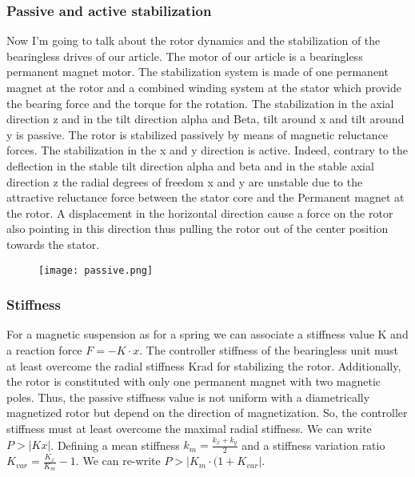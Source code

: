 \subsubsection{Passive and active stabilization}
Now I’m going to talk about the rotor dynamics and the stabilization of the bearingless drives of our article. The motor of our article is a bearingless permanent magnet motor. The stabilization system is made of one permanent magnet at the rotor and a combined winding system at the stator which provide the bearing force and the torque for the rotation.
The stabilization in the axial direction z and in the tilt direction alpha and Beta, tilt around x and tilt around y is passive. The rotor is stabilized passively by means of magnetic reluctance forces. The stabilization in the x and y direction is active.
Indeed, contrary to the deflection in the stable tilt direction alpha and beta and in the stable axial direction z the radial degrees of freedom x and y are unstable due to the attractive reluctance force between the stator core and the Permanent magnet at the rotor.
A displacement in the horizontal direction cause a force on the rotor also pointing in this direction thus pulling the rotor out of the center position towards the stator. 
\begin{figure}[H]
    \centering
    \texttt{[image: passive.png]}
\end{figure}


\subsubsection{Stiffness}
For a magnetic suspension as for a spring we can associate a stiffness value K and a reaction force $F=-K\cdot x$.
The controller stiffness of the bearingless unit must at least overcome the radial stiffness Krad for stabilizing the rotor. Additionally, the rotor is constituted with only one permanent magnet with two magnetic poles. Thus, the passive stiffness value is not uniform with a diametrically magnetized rotor but depend on the direction of magnetization. So, the controller stiffness must at least overcome the maximal radial stiffness. We can write $P>|Kx|$.
Defining a mean stiffness ${ k }_{ m }=\frac { { k }_{ x }+{ k }_{ y } }{ 2 } $ and a stiffness variation ratio ${ K }_{ var }=\frac { { K }_{ x } }{ { K }_{ m } } -1$.
We can re-write
$P>\left| { K }_{ m }\cdot (1+{ K }_{ var } \right| $.

